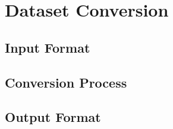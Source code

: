 \section{Dataset Conversion}

\subsection{Input Format}

\subsection{Conversion Process}

\subsection{Output Format}
